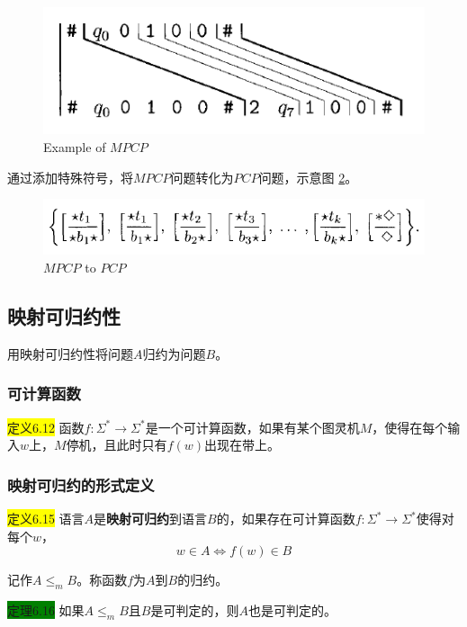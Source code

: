 \documentclass[a4paper]{article}
\begin{document}
	\begin{figure}[htb]
		\centering
		\includegraphics[scale=0.8]{./figure/6.2-1.png}
		\caption{Example of $MPCP$}
		\label{F060201}
	\end{figure}

	通过添加特殊符号，将$MPCP$问题转化为$PCP$问题，示意图 \ref{F060202}。

	\begin{figure}[htb]
		\centering
		\includegraphics[scale=0.8]{./figure/6.2-2.png}
		\caption{$MPCP$ to $PCP$}
		\label{F060202}
	\end{figure}
	

\subsection{映射可归约性}

	用映射可归约性将问题$A$归约为问题$B$。

\subsubsection{可计算函数}

	\colorbox{yellow}{定义6.12} 函数$f:\Sigma^* \rightarrow \Sigma^*$是一个可计算函数，如果有某个图灵机$M$，使得在每个输入$w$上，$M$停机，且此时只有$f(w)$出现在带上。

\subsubsection{映射可归约的形式定义}

	\colorbox{yellow}{定义6.15} 语言$A$是\textbf{映射可归约}到语言$B$的，如果存在可计算函数$f:\Sigma^* \rightarrow \Sigma^*$使得对每个$w$，
	$$w \in A \Leftrightarrow f(w) \in B$$
	
	记作$A \leq_m B$。称函数$f$为$A$到$B$的归约。

	\colorbox{green}{定理6.16} 如果$A \leq_m B$且$B$是可判定的，则$A$也是可判定的。
	
\end{document}

